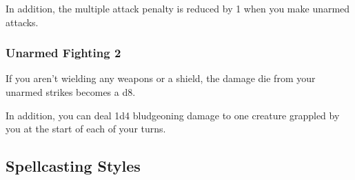     In addition, the multiple attack penalty is reduced by 1 when you make unarmed attacks.
\subsubsection{Unarmed Fighting 2}
    If you aren't wielding any weapons or a shield, the damage die from your unarmed strikes becomes a d8.

    In addition, you can deal 1d4 bludgeoning damage to one creature grappled by you at the start of each of your turns.

\subsection*{Spellcasting Styles} \label{ssec::spellcastingstyles}




